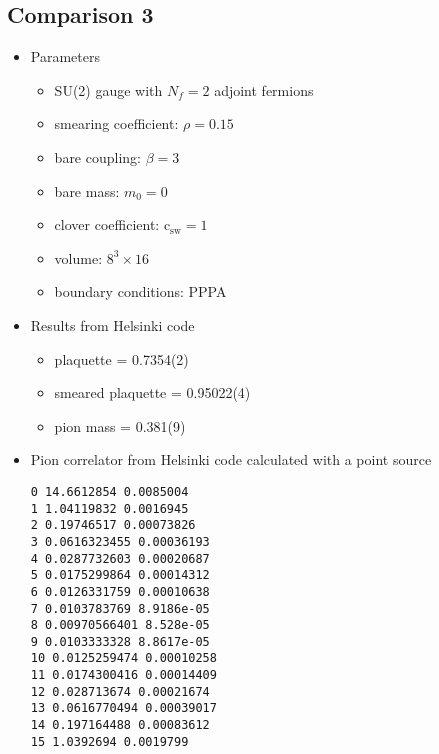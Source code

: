 \documentclass[12pt]{article}
\newcommand{\csw}{\mathrm{c}_\mathrm{sw}}
\begin{document}
\subsection*{Comparison 3}
\begin{itemize}
\item Parameters
\begin{itemize}
 \item SU(2) gauge with $N_f=2$ adjoint fermions
 \item smearing coefficient: $\rho=0.15$
 \item bare coupling: $\beta=3$
 \item bare mass: $m_0=0$
 \item clover coefficient: $\csw=1$
 \item volume: $8^3\times16$
 \item boundary conditions: PPPA
\end{itemize}
\item Results from Helsinki code
\begin{itemize}
 \item plaquette = 0.7354(2)
 \item smeared plaquette = 0.95022(4)
 \item pion mass = 0.381(9)
\end{itemize}
\item Pion correlator from Helsinki code calculated with a point source
\begin{verbatim}
0 14.6612854 0.0085004
1 1.04119832 0.0016945
2 0.19746517 0.00073826
3 0.0616323455 0.00036193
4 0.0287732603 0.00020687
5 0.0175299864 0.00014312
6 0.0126331759 0.00010638
7 0.0103783769 8.9186e-05
8 0.00970566401 8.528e-05
9 0.0103333328 8.8617e-05
10 0.0125259474 0.00010258
11 0.0174300416 0.00014409
12 0.028713674 0.00021674
13 0.0616770494 0.00039017
14 0.197164488 0.00083612
15 1.0392694 0.0019799
\end{verbatim}
\end{itemize}
\end{document}

